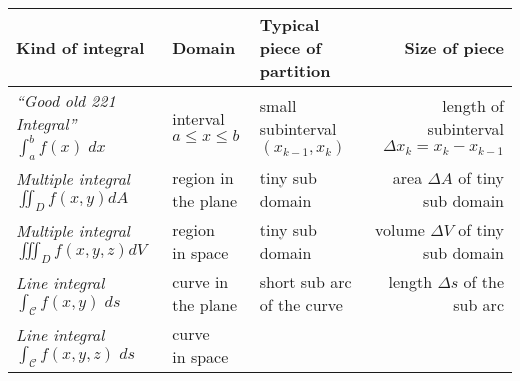 \begin{table}[t]\sffamily\color{darkbluegreen}
  \begin{tabular}{lllr} 
    \toprule
    \rule{0pt}{16pt}%
    \parbox{9em}{\centering \bfseries Kind of integral} & 
    \parbox{7em}{\centering \bfseries Domain} & 
    \parbox{9em}{\centering \bfseries Typical piece of partition} & 
    \parbox{9em}{\centering \bfseries Size of piece}\\[2ex] \midrule
    \rule{0pt}{22pt}%
    \parbox{9em}{\centering \itshape ``Good old 221 Integral''\\ $\int_a^b f(x)\; dx$} & 
    \parbox{7em}{\centering interval\\$a\le x\le b$ } & 
    \parbox{9em}{\centering  small subinterval $(x_{k-1}, x_k)$  } & 
    \parbox{9em}{\centering  length of subinterval $\Delta x_k = x_k -
      x_{k-1}$}\\[3ex]\midrule
    \rule{0pt}{16pt}%
    \parbox{9em}{\centering \itshape Multiple integral\\
      $\iint_D f(x, y) dA $}  & 
    \parbox{7em}{\centering region in\\the plane}  & 
    \parbox{9em}{\centering tiny sub domain}   &  
    \parbox{9em}{\centering area $\Delta A$ of\\tiny sub domain} \\[2ex]\midrule
    \rule{0pt}{16pt}%
    \parbox{9em}{\centering \itshape Multiple integral\\
      $\iiint_D f(x, y, z) dV $}  & 
    \parbox{7em}{\centering region\\in space}  & 
    \parbox{9em}{\centering tiny sub domain}   &  
    \parbox{9em}{\centering volume $\Delta V$ of\\tiny sub domain} \\[2ex]\midrule
    \rule{0pt}{16pt}%
    \parbox{9em}{\centering \itshape Line integral\\
      $\int_{\mathcal{C}} f(x, y)\; ds$}  & 
    \parbox{7em}{\centering curve in\\the plane}  &  
    \parbox{9em}{\centering short sub arc\\of the curve}  &   
    \parbox{9em}{\centering length $\Delta s$ of\\the sub arc}\\[2ex]\midrule
    \rule{0pt}{16pt}%
    \parbox{9em}{\centering \itshape Line integral\\
      $\int_{\mathcal{C}} f(x, y, z)\; ds$}  & 
    \parbox{7em}{\centering curve\\in space}  &  

\end{tabular}
\end{table}
